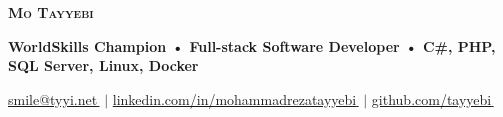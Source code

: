 \documentclass[11pt,a4paper]{article}
\let\orighref\href
\renewcommand{\href}[2]{\orighref{#1}{#2\,{\textsuperscript{\tiny{\faExternalLink}}}}}
\begin{document}

\begin{center}
    \textbf{\Huge \scshape Mo Tayyebi} \\ \vspace{5pt}

    \textbf{ WorldSkills Champion • Full-stack Software Developer • C\#, PHP, SQL Server, Linux, Docker } \\ \vspace{1pt}
    
    \href{mailto:tayyebimohammadreza+r@gmail.com}{\small{smile@tyyi.net}} $|$ 
    \href{https://www.linkedin.com/in/mohammadrezatayyebi/}{\small{linkedin.com/in/mohammadrezatayyebi}} $|$
    \href{https://github.com/tayyebi}{\small{github.com/tayyebi}}
    
\end{center}
\end{document}
